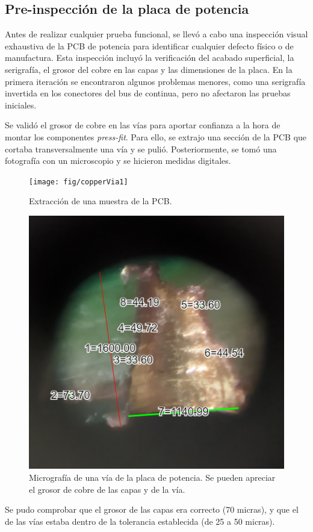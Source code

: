 \subsection{Pre-inspección de la placa de potencia}
Antes de realizar cualquier prueba funcional, se llevó a cabo una inspección visual exhaustiva de la PCB de potencia para identificar cualquier defecto físico o de manufactura. Esta inspección incluyó la verificación del acabado superficial, la serigrafía, el grosor del cobre en las capas y las dimensiones de la placa. En la primera iteración se encontraron algunos problemas menores, como una serigrafía invertida en los conectores del bus de continua, pero no afectaron las pruebas iniciales.

Se validó el grosor de cobre en las vías para aportar confianza a la hora de montar los componentes \textit{press-fit}. Para ello, se extrajo una sección de la PCB que cortaba transversalmente una vía y se pulió. Posteriormente, se tomó una fotografía con un microscopio y se hicieron medidas digitales.

\begin{figure}[H]
	\centering
	\texttt{[image: fig/copperVia1]}
	\caption{Extracción de una muestra de la PCB.}
\end{figure}


\begin{figure}[H]
	\centering
	\includegraphics[width=0.7\linewidth]{fig/copperVia}
	\caption{Micrografía de una vía de la placa de potencia. Se pueden apreciar el grosor de cobre de las capas y de la vía.}
\end{figure}

Se pudo comprobar que el grosor de las capas era correcto (70 micras), y que el de las vías estaba dentro de la tolerancia establecida (de 25 a 50 micras).

